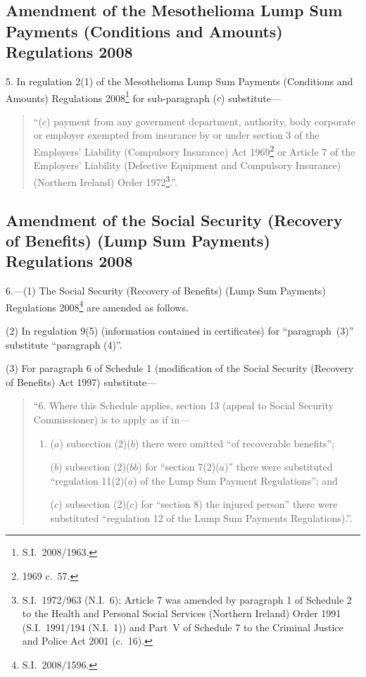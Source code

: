 \documentclass[12pt,a4paper]{article}
\begin{document}
\subsection[5. Amendment of the Mesothelioma Lump Sum Payments (Conditions and Amounts) Regulations 2008]{Amendment of the Mesothelioma Lump Sum Payments (Conditions and Amounts) Regulations 2008}

5.  In regulation 2(1) of the Mesothelioma Lump Sum Payments (Conditions and Amounts) Regulations 2008\footnote{S.I.~2008/1963.} for sub-paragraph ($c$)  substitute—
\begin{quotation}
“($c$) payment from any government department, authority, body corporate or employer exempted from insurance by or under section 3 of the Employers’ Liability (Compulsory Insurance) Act 1969\footnote{1969 c.~57.} or Article 7 of the Employers’ Liability (Defective Equipment and Compulsory Insurance) (Northern Ireland) Order 1972\footnote{S.I.~1972/963 (N.I.~6); Article 7 was amended by paragraph 1 of Schedule 2 to the Health and Personal Social Services (Northern Ireland) Order 1991 (S.I.~1991/194 (N.I.~1)) and Part~V of Schedule 7 to the Criminal Justice and Police Act 2001 (c.~16).}.”.
\end{quotation}

\subsection[6. Amendment of the Social Security (Recovery of Benefits) (Lump Sum Payments) Regulations 2008]{Amendment of the Social Security (Recovery of Benefits) (Lump Sum Payments) Regulations 2008}

6.---(1)  The Social Security (Recovery of Benefits) (Lump Sum Payments) Regulations 2008\footnote{S.I.~2008/1596.} are amended as follows.

(2) In regulation 9(5) (information contained in certificates) for “paragraph~(3)” substitute “paragraph (4)”.

(3) For paragraph 6 of Schedule 1 (modification of the Social Security (Recovery of Benefits) Act 1997) substitute—
\begin{quotation}
“6.  Where this Schedule applies, section 13 (appeal to Social Security Commissioner) is to apply as if in—
\begin{enumerate}\item[]
($a$) subsection (2)($b$)  there were omitted “of recoverable benefits”;

($b$) subsection (2)($bb$)  for “section 7(2)($a$)” there were substituted “regulation 11(2)($a$)  of the Lump Sum Payment Regulations”; and

($c$) subsection (2)($c$)  for “section 8) the injured person” there were substituted “regulation 12 of the Lump Sum Payments Regulations).”.
\end{enumerate}
\end{quotation}
\end{document}
